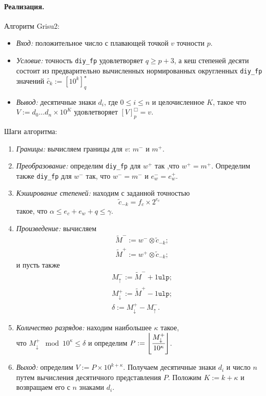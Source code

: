 \paragraph{Реализация.}
Алгоритм \textsf{Grisu2}: \begin{itemize}
\item \textit{Вход:} положительное число с плавающей точкой $v$ точности $p$.
\item \textit{Условие:} точность \texttt{diy\_fp} удовлетворяет $q \geqslant p + 3$, а кеш степеней десяти состоит из предварительно вычисленных нормированных округленных  \texttt{diy\_fp} значений $\tilde{c_k} := \left[ 10^k \right]_q^{\star}$
\item \textit{Вывод:} десятичные знаки $d_i$, где $0 \leqslant i \leqslant n$ и целочисленное $K$, такое что $V:=d_0\dots d_n \times 10 ^K$ удовлетворяет $[V]^{\Box}_p = v$. 
\end{itemize}

Шаги алгоритма:
\begin{enumerate}
\item \textit{Границы:} вычисляем границы для $v$: $m^{-}$ и $m^{+}$. 
\item \textit{Преобразование:} определим \texttt{diy\_fp} для $w^+$ так ,что $w^+ = m^+$. 
Определим также \texttt{diy\_fp} для $w^-$ так, что $w^{-} = m^-$ и $e_w^- = e_w^+$.
\item \textit{Кэширование степеней:} находим с заданной точностью $$\tilde{c}_{-k} = f_c \times 2^{e_c}$$ такое, что $\alpha \leqslant e_c + e_w + q \leqslant \gamma$.
\item \textit{Произведение:} вычисляем \begin{align*}
&\tilde{M}^- := w^- \otimes \tilde{c}_{-k}; \\
&\tilde{M}^+ := w^+ \otimes \tilde{c}_{-k};
\end{align*}и пусть также \begin{align*} & M_\uparrow^- := \tilde{M}^- + 1 \texttt{ulp};\\
& M_\downarrow^+ := \tilde{M}^+ - 1 \texttt{ulp};\\
& \delta := M_\downarrow^+ - M_\uparrow^-.
\end{align*}
\item \textit{Количество разрядов:} находим наибольшее $\kappa$ такое,\\ что $M_\downarrow^+ \mod 10^\kappa \leqslant \delta$ и определим $P:= \left\lfloor \cfrac{M_\downarrow^+}{10^\kappa} \right\rfloor$.
\item \textit{Выход:} определим $V:= P \times 10^{k + \kappa}$. 
Получаем десятичные знаки $d_i$ и число $n$ путем вычисления десятичного представления $P$.
Положим $K:=k+\kappa$ и возвращаем его с $n$ знаками $d_i$.
\end{enumerate}


